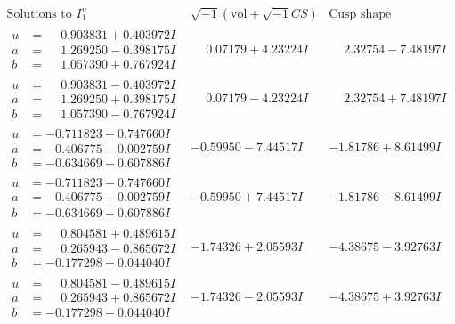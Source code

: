 \documentclass[1p]{elsarticle_modified}
\theoremstyle{definition}
\newcommand{\I}{\sqrt{-1}}
\begin{document}
$$\begin{array}{c|c|c}  
\text{Solutions to }I^u_{1}& \I (\text{vol} + \sqrt{-1}CS) & \text{Cusp shape}\\
 \hline 
\begin{aligned}
u &= \phantom{-}0.903831 + 0.403972 I \\
a &= \phantom{-}1.269250 - 0.398175 I \\
b &= \phantom{-}1.057390 + 0.767924 I\end{aligned}
 & \phantom{-}0.07179 + 4.23224 I & \phantom{-}2.32754 - 7.48197 I \\ \hline\begin{aligned}
u &= \phantom{-}0.903831 - 0.403972 I \\
a &= \phantom{-}1.269250 + 0.398175 I \\
b &= \phantom{-}1.057390 - 0.767924 I\end{aligned}
 & \phantom{-}0.07179 - 4.23224 I & \phantom{-}2.32754 + 7.48197 I \\ \hline\begin{aligned}
u &= -0.711823 + 0.747660 I \\
a &= -0.406775 - 0.002759 I \\
b &= -0.634669 - 0.607886 I\end{aligned}
 & -0.59950 - 7.44517 I & -1.81786 + 8.61499 I \\ \hline\begin{aligned}
u &= -0.711823 - 0.747660 I \\
a &= -0.406775 + 0.002759 I \\
b &= -0.634669 + 0.607886 I\end{aligned}
 & -0.59950 + 7.44517 I & -1.81786 - 8.61499 I \\ \hline\begin{aligned}
u &= \phantom{-}0.804581 + 0.489615 I \\
a &= \phantom{-}0.265943 - 0.865672 I \\
b &= -0.177298 + 0.044040 I\end{aligned}
 & -1.74326 + 2.05593 I & -4.38675 - 3.92763 I \\ \hline\begin{aligned}
u &= \phantom{-}0.804581 - 0.489615 I \\
a &= \phantom{-}0.265943 + 0.865672 I \\
b &= -0.177298 - 0.044040 I\end{aligned}
 & -1.74326 - 2.05593 I & -4.38675 + 3.92763 I \\ \hline\begin{aligned}

\end{aligned}
\end{array}$$
\end{document}
